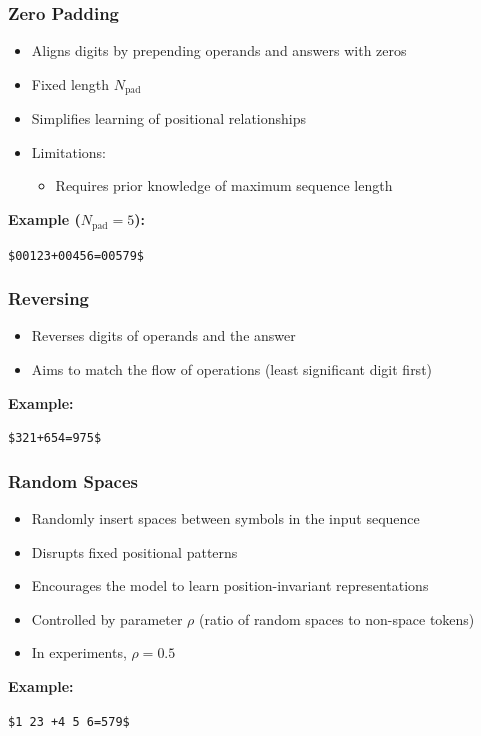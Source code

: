 \documentclass[14pt,aspectratio=169]{beamer}
\theoremstyle{remark}
\begin{document}
\begin{frame}
    \frametitle{Zero Padding}
    \begin{itemize}
        \item Aligns digits by prepending operands and answers with zeros
        \item Fixed length $N_{\text{pad}}$
        \item Simplifies learning of positional relationships
        \item Limitations:
              \begin{itemize}
                  \item Requires prior knowledge of maximum sequence length
              \end{itemize}
    \end{itemize}
    \vspace{0.5em}
    \textbf{Example ($N_{\text{pad}} = 5$):}
    \begin{center}
        \texttt{\$00123+00456=00579\$}
    \end{center}
\end{frame}

\begin{frame}
    \frametitle{Reversing}
    \begin{itemize}
        \item Reverses digits of operands and the answer
        \item Aims to match the flow of operations (least significant digit first)
    \end{itemize}
    \vspace{0.5em}
    \textbf{Example:}
    \begin{center}
        \item \texttt{\$321+654=975\$}
    \end{center}
\end{frame}

\begin{frame}
    \frametitle{Random Spaces}
    \begin{itemize}
        \item Randomly insert spaces between symbols in the input sequence
        \item Disrupts fixed positional patterns
        \item Encourages the model to learn position-invariant representations
        \item Controlled by parameter $\rho$ (ratio of random spaces to non-space tokens)
        \item In experiments, $\rho = 0.5$
    \end{itemize}
    \vspace{0.5em}
    \textbf{Example:}
    \begin{center}
        \texttt{\$1 23 +4  5 6=579\$}
    \end{center}
\end{frame}
\end{document}
